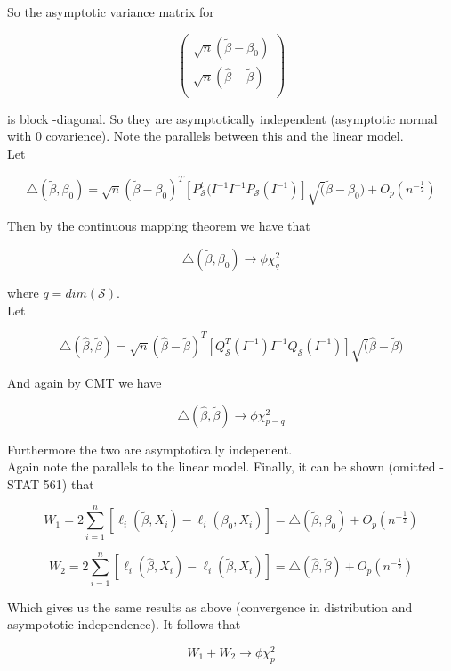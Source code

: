 \documentclass[11pt,fleqn]{book} %
\begin{document}
	So the asymptotic variance matrix for 

			$$\begin{pmatrix}
			\sqrt{n}(\tilde{\beta} - \beta_0)\\
			\sqrt{n}(\hat{\beta} - \tilde{\beta})\\
			\end{pmatrix} $$

	is block -diagonal. So they are asymptotically independent (asymptotic normal with 0 covarience). Note the parallels between this and the linear model. \\

Let 

		$$\triangle (\tilde{\beta}, \beta_0)= \sqrt{n} (\tilde{\beta} - \beta_0)^T\left[P^t_\mathcal{S}(I^{-1} I^{-1} P_\mathcal{S}(I^{-1})\right]\sqrt(\tilde{\beta} - \beta_0) + O_p(n^{-\frac{1}{2}})$$

Then by the continuous mapping theorem we have that

		$$\triangle (\tilde{\beta}, \beta_0) \rightarrow \phi \chi^2_{q}$$

where $q = dim(\mathcal{S})$.\\

Let 

		$$\triangle (\hat{\beta}, \tilde{\beta})  = \sqrt{n} (\hat{\beta} - \tilde{\beta})^T \left[Q^T_\mathcal{S}(I^{-1}) I^{-1} Q_\mathcal{S}(I^{-1})\right]\sqrt(\hat{\beta} - \tilde{\beta})$$

And again by CMT we have

		$$\triangle (\hat{\beta}, \tilde{\beta}) \rightarrow \phi \chi^2_{p - q}$$

Furthermore the two are asymptotically indepenent.\\

Again note the parallels to the linear model. Finally, it can be shown (omitted - STAT 561) that 

		$$W_1 = 2 \sum^n_{i=1} \left[\ell_i(\tilde{\beta}, X_i) - \ell_i(\beta_0, X_i) \right] = \triangle (\tilde{\beta}, \beta_0) + O_p(n^{-\frac{1}{2}})$$

		$$W_2 = 2 \sum^n_{i=1} \left[\ell_i(\hat{\beta}, X_i) - \ell_i(\tilde{\beta}, X_i) \right] = \triangle (\hat{\beta}, \tilde{\beta}) + O_p(n^{-\frac{1}{2}})$$		


Which gives us the same results as above (convergence in distribution and asympototic independence). It follows that

		$$W_1 + W_2 \rightarrow \phi \chi^2_p $$
\end{document}
